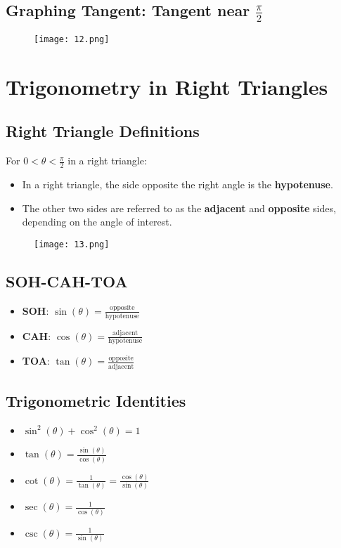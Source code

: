 \subsection{Graphing Tangent: Tangent near $\frac{\pi}{2}$}
\begin{figure}
    \centering
    \texttt{[image: 12.png]}
\end{figure}

\section{Trigonometry in Right Triangles}
\subsection{Right Triangle Definitions}
For $0<\theta<\frac{\pi}{2}$ in a right triangle:
\begin{itemize}
    \item In a right triangle, the side opposite the right angle is the \textbf{hypotenuse}.
    \item The other two sides are referred to as the \textbf{adjacent} and \textbf{opposite} sides, depending on the angle of interest.
\end{itemize}
\begin{figure}
    \centering
    \texttt{[image: 13.png]}
\end{figure}

\subsection{SOH-CAH-TOA}
\begin{itemize}
    \item \textbf{SOH}: $\sin(\theta) = \frac{\text{opposite}}{\text{hypotenuse}}$
    \item \textbf{CAH}: $\cos(\theta) = \frac{\text{adjacent}}{\text{hypotenuse}}$
    \item \textbf{TOA}: $\tan(\theta) = \frac{\text{opposite}}{\text{adjacent}}$
\end{itemize}

\subsection{Trigonometric Identities}
\begin{itemize}
    \item $\sin^2(\theta) + \cos^2(\theta) = 1$
    \item $\tan(\theta) = \frac{\sin(\theta)}{\cos(\theta)}$
    \item $\cot(\theta) = \frac{1}{\tan(\theta)} = \frac{\cos(\theta)}{\sin(\theta)}$
    \item $\sec(\theta) = \frac{1}{\cos(\theta)}$
    \item $\csc(\theta) = \frac{1}{\sin(\theta)}$
\end{itemize}

